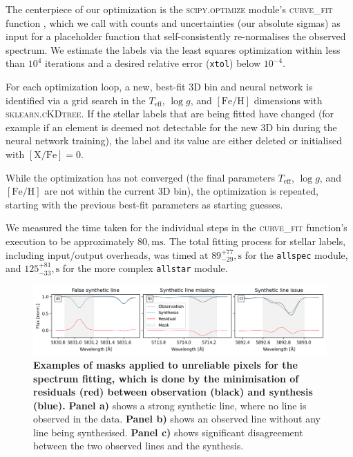 \documentclass[
  journal=pasa,
  manuscript=research-paper, %
  year=2024,
  volume=37
]{cup-journal}
\newcommand{\Teff}{$T_\mathrm{eff}$\xspace}
\newcommand{\logg}{$\log g$\xspace}
\newcommand{\feh}{$\mathrm{[Fe/H]}$\xspace}
\newcommand{\TLF}{\Teff, \logg, and \feh}
\begin{document}
The centerpiece of our optimization is the \textsc{scipy.optimize} module's \textsc{curve\_fit} function \citep{scipy}, which we call with counts and uncertainties (our absolute sigmas) as input for a placeholder function that self-consistently re-normalises the observed spectrum. We estimate the labels via the least squares optimization within less than $10^4$ iterations and a desired relative error (\texttt{xtol}) below $10^{-4}$.

For each optimization loop, a new, best-fit 3D bin and neural network is identified via a grid search in the \TLF dimensions with \textsc{sklearn.cKDtree}. If the stellar labels that are being fitted have changed (for example if an element is deemed not detectable for the new 3D bin during the neural network training), the label and its value are either deleted or initialised with $\mathrm{[X/Fe]} = 0$.

While the optimization has not converged (the final parameters \TLF are not within the current 3D bin), the optimization is repeated, starting with the previous best-fit parameters as starting guesses.

We measured the time taken for the individual steps in the \textsc{curve\_fit} function's execution to be approximately $80,\mathrm{ms}$. The total fitting process for stellar labels, including input/output overheads, was timed at $89_{-29}^{+77},\mathrm{s}$ for the \texttt{allspec} module, and $125_{-33}^{+81},\mathrm{s}$ for the more complex \texttt{allstar} module.

\begin{figure}[ht]
\centering  
\includegraphics[width=\textwidth]{figures/example_masking_sun.png}
\caption{\textbf{Examples of masks applied to unreliable pixels for the spectrum fitting, which is done by the minimisation of residuals (red) between observation (black) and synthesis (blue).} \textbf{Panel a)} shows a strong synthetic line, where no line is observed in the data. \textbf{Panel b)} shows an observed line without any line being synthesised. \textbf{Panel c)} shows significant disagreement between the two observed lines and the synthesis.} \label{fig:example_masking_sun}
\end{figure}
\end{document}
